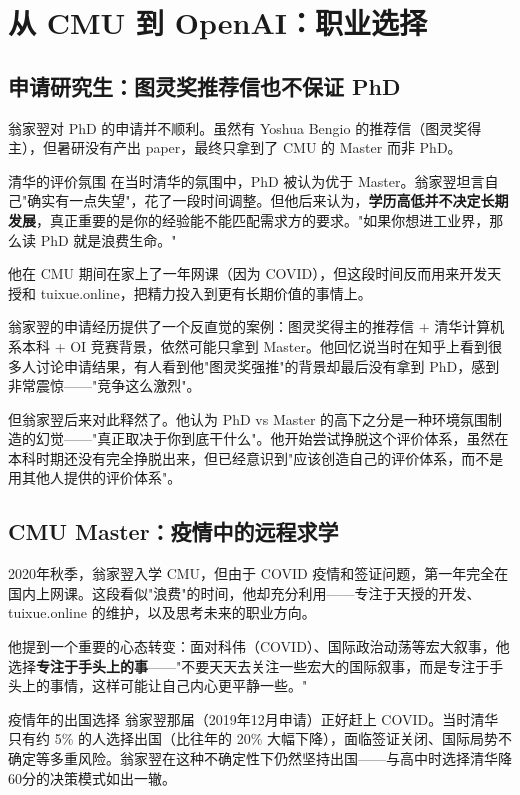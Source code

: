 \section{从 CMU 到 OpenAI：职业选择}

\subsection{申请研究生：图灵奖推荐信也不保证 PhD}

翁家翌对 PhD 的申请并不顺利。虽然有 Yoshua Bengio 的推荐信（图灵奖得主），但暑研没有产出 paper，最终只拿到了 CMU 的 Master 而非 PhD。

\begin{knowledgebox}{清华的评价氛围}
在当时清华的氛围中，PhD 被认为优于 Master。翁家翌坦言自己"确实有一点失望"，花了一段时间调整。但他后来认为，\textbf{学历高低并不决定长期发展}，真正重要的是你的经验能不能匹配需求方的要求。"如果你想进工业界，那么读 PhD 就是浪费生命。"
\end{knowledgebox}

他在 CMU 期间在家上了一年网课（因为 COVID），但这段时间反而用来开发天授和 tuixue.online，把精力投入到更有长期价值的事情上。

翁家翌的申请经历提供了一个反直觉的案例：图灵奖得主的推荐信 + 清华计算机系本科 + OI 竞赛背景，依然可能只拿到 Master。他回忆说当时在知乎上看到很多人讨论申请结果，有人看到他"图灵奖强推"的背景却最后没有拿到 PhD，感到非常震惊——"竞争这么激烈"。

但翁家翌后来对此释然了。他认为 PhD vs Master 的高下之分是一种环境氛围制造的幻觉——"真正取决于你到底干什么"。他开始尝试挣脱这个评价体系，虽然在本科时期还没有完全挣脱出来，但已经意识到"应该创造自己的评价体系，而不是用其他人提供的评价体系"。

\subsection{CMU Master：疫情中的远程求学}

2020年秋季，翁家翌入学 CMU，但由于 COVID 疫情和签证问题，第一年完全在国内上网课。这段看似"浪费"的时间，他却充分利用——专注于天授的开发、tuixue.online 的维护，以及思考未来的职业方向。

他提到一个重要的心态转变：面对科伟（COVID）、国际政治动荡等宏大叙事，他选择\textbf{专注于手头上的事}——"不要天天去关注一些宏大的国际叙事，而是专注于手头上的事情，这样可能让自己内心更平静一些。"

\begin{knowledgebox}{疫情年的出国选择}
翁家翌那届（2019年12月申请）正好赶上 COVID。当时清华只有约 5\% 的人选择出国（比往年的 20\% 大幅下降），面临签证关闭、国际局势不确定等多重风险。翁家翌在这种不确定性下仍然坚持出国——与高中时选择清华降60分的决策模式如出一辙。
\end{knowledgebox}

